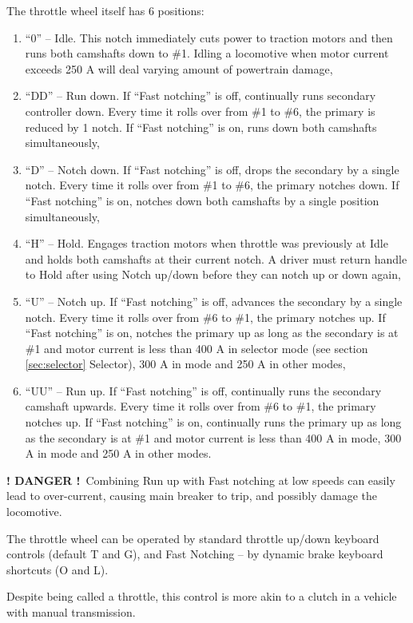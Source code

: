 \documentclass[11pt, a4paper]{article}
\newcommand{\powermode}[1]{%
    \begingroup
    \setlength{\fboxsep}{0pt}%
    \raisebox{0.1em}{%
        \colorbox{black}{%
            \parbox[c][1.4em][c]{1.4em}{%
                \centering
                \color{white}\bfseries #1%
            }%
        }%
    }%
    \endgroup
}
\newcommand{\danger}{\textbf{\color{red} ! DANGER !}}
\begin{document}
The throttle wheel itself has 6 positions:
\begin{enumerate}
\item ``0'' -- Idle. This notch immediately cuts power to traction motors and then runs both camshafts down to \#1. Idling a locomotive when motor current exceeds 250 A will deal varying amount of powertrain damage,
\item ``DD'' -- Run down. If ``Fast notching'' is off, continually runs secondary controller down. Every time it rolls over from \#1 to \#6, the primary is reduced by 1 notch. If ``Fast notching'' is on, runs down both camshafts simultaneously,
\item ``D'' -- Notch down. If ``Fast notching'' is off, drops the secondary by a single notch. Every time it rolls over from \#1 to \#6, the primary notches down. If ``Fast notching'' is on, notches down both camshafts by a single position simultaneously,
\item ``H'' -- Hold. Engages traction motors when throttle was previously at Idle and holds both camshafts at their current notch. A driver must return handle to Hold after using Notch up/down before they can notch up or down again,
\item ``U'' -- Notch up. If ``Fast notching'' is off, advances the secondary by a single notch. Every time it rolls over from \#6 to \#1, the primary notches up. If ``Fast notching'' is on, notches the primary up as long as the secondary is at \#1 and motor current is less than 400 A in \powermode{Y} selector mode (see section \ref{sec:selector} Selector), 300 A in \powermode{S} mode and 250 A in other modes,
\newpage
\item ``UU'' -- Run up. If ``Fast notching'' is off, continually runs the secondary camshaft upwards. Every time it rolls over from \#6 to \#1, the primary notches up. If ``Fast notching'' is on, continually runs the primary up as long as the secondary is at \#1 and motor current is less than 400 A in \powermode{Y} mode, 300 A in \powermode{S} mode and 250 A in other modes.
\end{enumerate}

\danger\ Combining Run up with Fast notching at low speeds can easily lead to over-current, causing main breaker to trip, and possibly damage the locomotive.

The throttle wheel can be operated by standard throttle up/down keyboard controls (default T and G), and Fast Notching -- by dynamic brake keyboard shortcuts (O and L).

Despite being called a throttle, this control is more akin to a clutch in a vehicle with manual transmission.
\end{document}
